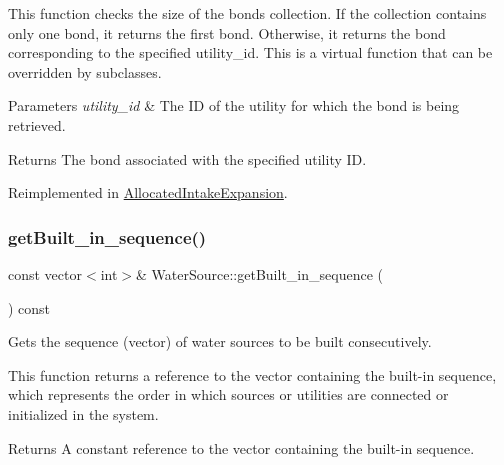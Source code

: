 This function checks the size of the {\ttfamily bonds} collection. If the collection contains only one bond, it returns the first bond. Otherwise, it returns the bond corresponding to the specified {\ttfamily utility\+\_\+id}. This is a virtual function that can be overridden by subclasses.


\begin{DoxyParams}{Parameters}
{\em utility\+\_\+id} & The ID of the utility for which the bond is being retrieved.\\
\hline
\end{DoxyParams}
\begin{DoxyReturn}{Returns}
The bond associated with the specified utility ID. 
\end{DoxyReturn}


Reimplemented in \mbox{\hyperlink{classAllocatedIntakeExpansion_a3091edd0793cf2bd4e01fc178ae72ffb}{Allocated\+Intake\+Expansion}}.

\mbox{\label{classWaterSource_a1e28dee97f62fbb9845300fc2768d172}} 
\subsubsection{\texorpdfstring{get\+Built\+\_\+in\+\_\+sequence()}{getBuilt\_in\_sequence()}}
{\footnotesize\ttfamily const vector$<$int$>$\& Water\+Source\+::get\+Built\+\_\+in\+\_\+sequence (\begin{DoxyParamCaption}{ }\end{DoxyParamCaption}) const}



Gets the sequence (vector) of water sources to be built consecutively. 

This function returns a reference to the vector containing the built-\/in sequence, which represents the order in which sources or utilities are connected or initialized in the system.

\begin{DoxyReturn}{Returns}
A constant reference to the vector containing the built-\/in sequence. 
\end{DoxyReturn}
\mbox{\label{classWaterSource_ac1e8880f0aeb56b2728e253d3500ef40}} 
